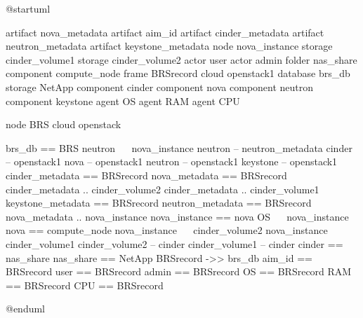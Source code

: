 @startuml

artifact nova_metadata
artifact aim_id
artifact cinder_metadata
artifact neutron_metadata
artifact keystone_metadata
node nova_instance
storage cinder_volume1
storage cinder_volume2
actor user
actor admin
folder nas_share
component compute_node
frame BRSrecord
cloud openstack1
database brs_db
storage NetApp
component cinder
component nova
component neutron
component keystone
agent OS
agent RAM
agent CPU

node BRS {
 cloud openstack
}

brs_db == BRS
neutron ~~ nova_instance
neutron -- neutron_metadata
cinder -- openstack1
nova -- openstack1
neutron -- openstack1
keystone -- openstack1
cinder_metadata == BRSrecord
nova_metadata == BRSrecord
cinder_metadata .. cinder_volume2
cinder_metadata .. cinder_volume1
keystone_metadata == BRSrecord
neutron_metadata == BRSrecord
nova_metadata .. nova_instance
nova_instance == nova
OS ~~ nova_instance
nova == compute_node
nova_instance ~~ cinder_volume2
nova_instance ~~ cinder_volume1
cinder_volume2 -- cinder
cinder_volume1 -- cinder
cinder == nas_share
nas_share == NetApp
BRSrecord ->> brs_db
aim_id == BRSrecord
user == BRSrecord
admin == BRSrecord
OS == BRSrecord
RAM == BRSrecord
CPU == BRSrecord



@enduml
